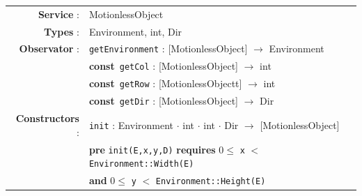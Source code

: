 \documentclass[12pt]{report}
\begin{document}
\begin{tabular}{rl}

\textbf{Service} : & MotionlessObject \\

\textbf{Types} : & \textrm{Environment}, \textrm{int}, \textrm{Dir} \\

\textbf{Observator} : & \texttt{getEnvironment} : \textrm{[MotionlessObject]} $\rightarrow$ \textrm{Environment} \\
& \textbf{const}~\texttt{getCol} : \textrm{[MotionlessObject]} $\rightarrow$ \textrm{int} \\
& \textbf{const}~\texttt{getRow} : \textrm{[MotionlessObjectt]} $\rightarrow$ \textrm{int} \\
& \textbf{const}~\texttt{getDir} : \textrm{[MotionlessObject]} $\rightarrow$ \textrm{Dir} \\

\textbf{Constructors} : & \texttt{init} : \textrm{Environment} $\cdot$ \textrm{int} $\cdot$ \textrm{int} $\cdot$ \textrm{Dir} $\rightarrow$ \textrm{[MotionlessObject]} \\
& \textbf{pre} \texttt{init(E,x,y,D)} \textbf{requires} $0 \leq$ \texttt{x} $<$ \texttt{Environment::Width(E)} \\
& \quad\quad\quad\quad \textbf{and} $0 \leq$ \texttt{y} $<$ \texttt{Environment::Height(E)} \\


\end{tabular}
\end{document}
